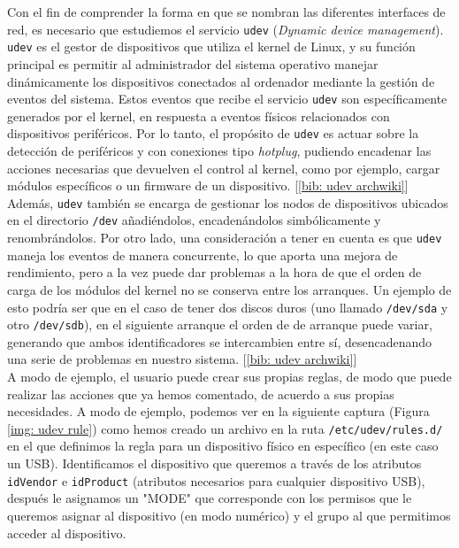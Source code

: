 \documentclass[a4paper, oneside, 12pt]{book}
\begin{document}
	\noindent Con el fin de comprender la forma en que se nombran las diferentes interfaces de red, es necesario que estudiemos el servicio \texttt{udev} (\textit{Dynamic device management}). \texttt{udev} es el gestor de dispositivos que utiliza el kernel de Linux, y su función principal es permitir al administrador del sistema operativo manejar dinámicamente los dispositivos conectados al ordenador mediante la gestión de eventos del sistema. Estos eventos que recibe el servicio \texttt{udev} son específicamente generados por el kernel, en respuesta a eventos físicos relacionados con dispositivos periféricos. Por lo tanto, el propósito de \texttt{udev} es actuar sobre la detección de periféricos y con conexiones tipo \textit{hotplug}, pudiendo encadenar las acciones necesarias que devuelven el control al kernel, como por ejemplo, cargar módulos específicos o un firmware de un dispositivo. [\ref{bib: udev archwiki}] \\
	
	\noindent Además, \texttt{udev} también se encarga de gestionar los nodos de dispositivos ubicados en el directorio \texttt{/dev} añadiéndolos, encadenándolos simbólicamente y renombrándolos. Por otro lado, una consideración a tener en cuenta es que \texttt{udev} maneja los eventos de manera concurrente, lo que aporta una mejora de rendimiento, pero a la vez puede dar problemas a la hora de que el orden de carga de los módulos del kernel no se conserva entre los arranques. Un ejemplo de esto podría ser que en el caso de tener dos discos duros (uno llamado \texttt{/dev/sda} y otro \texttt{/dev/sdb}), en el siguiente arranque el orden de de arranque puede variar, generando que ambos identificadores se intercambien entre sí, desencadenando una serie de problemas en nuestro sistema. [\ref{bib: udev archwiki}]\\
	
	\noindent A modo de ejemplo, el usuario puede crear sus propias reglas, de modo que puede realizar las acciones que ya hemos comentado, de acuerdo a sus propias necesidades. A modo de ejemplo, podemos ver en la siguiente captura (Figura \ref{img: udev rule}) como hemos creado un archivo en la ruta \texttt{/etc/udev/rules.d/} en el que definimos la regla para un dispositivo físico en específico (en este caso un USB). Identificamos el dispositivo que queremos a través de los atributos \texttt{idVendor} e \texttt{idProduct} (atributos necesarios para cualquier dispositivo USB), después le asignamos un "MODE" que corresponde con los permisos que le queremos asignar al dispositivo (en modo numérico) y el grupo al que permitimos acceder al dispositivo.\\
	
\end{document}
